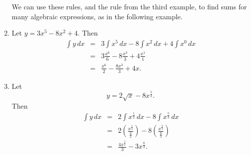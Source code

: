 \documentclass[polutonikogreek,english,twoside,openright]{article}
\newlength{\oldjot}
\begin{document}
\begin{enumerate}
We can use these rules, and the rule from the third example, to find sums for many algebraic expressions, as in the following example.

\item
Let $y = 3x^5 - 8x^2 + 4.$
Then
\setlength{\jot}{1.5ex}
\begin{eqnarray*}
\int\!y\,dx & = & 3\int\!x^5\,dx- 8\int\!x^2\,dx + 4\int\!x^0\,dx\\
& = & 3\frac{x^6}{6} - 8\frac{x^3}{3} + 4\frac{x^1}{1}\\
& = & \frac{x^6}{2} - \frac{8x^3}{3} + 4x.
\end{eqnarray*}
\setlength{\jot}{\oldjot}

\item
Let 
$$y = 2\sqrt{x} - 8x^{\frac{5}{3}}.$$
Then
\setlength{\jot}{2ex}
\begin{eqnarray*}
\int\!y\,dx & = & 2\int\!x^{\frac{1}{2}}\,dx - 8\int\!x^{\frac{5}{3}}\,dx\\
& = & 2\left(\frac{x^{\frac{3}{2}}}{\frac{3}{2}}\right) - 8\left(\frac{x^{\frac{8}{3}}}{\frac{8}{3}}\right)\\
& = & \frac{4x^{\frac{3}{2}}}{3} - 3x^{\frac{8}{3}}.
\end{eqnarray*}
\setlength{\jot}{\oldjot}
\end{enumerate}
\end{document}

